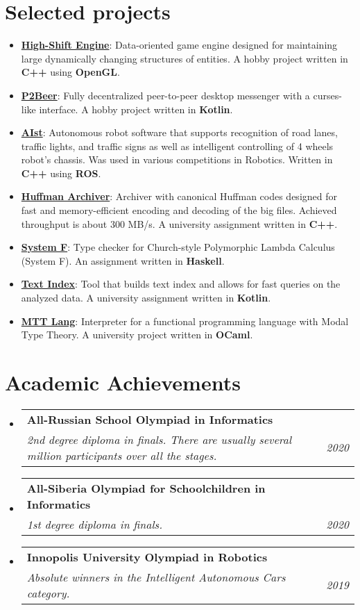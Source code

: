 \documentclass[letterpaper,11pt]{article}
\makeatletter
\newcommand{\resumeItem}[2]{
  \item\small{
    \textbf{#1}{: #2 \vspace{-2pt}}
  }
}
\newcommand{\resumeSubheading}[4]{
  \vspace{-1pt}\item
    \begin{tabular*}{0.97\textwidth}{l@{\extracolsep{\fill}}r}
      \textbf{#1} & #2 \\
      \textit{\small#3} & \textit{\small #4} \\
    \end{tabular*}\vspace{-5pt}
}
\newcommand{\resumeSubItem}[2]{\resumeItem{#1}{#2}\vspace{-4pt}}
\newcommand{\resumeSubHeadingListStart}{\begin{itemize}[leftmargin=*]}
\newcommand{\resumeSubHeadingListEnd}{\end{itemize}}
\makeatother
\begin{document}
\section{Selected projects}
  \resumeSubHeadingListStart
    \resumeSubItem{\href{https://github.com/bot-mne-v-rot/high-shift-engine}{High-Shift Engine}}
      {Data-oriented game engine designed for maintaining large dynamically changing structures of entities. A hobby project written in \textbf{C++} using \textbf{OpenGL}.}
    \resumeSubItem{\href{https://github.com/bot-mne-v-rot/p2beer}{P2Beer}}
      {Fully decentralized peer-to-peer desktop messenger with a curses-like interface. A hobby project written in \textbf{Kotlin}.}
    \resumeSubItem{\href{https://github.com/SmnTin/AIst}{AIst}}
      {Autonomous robot software that supports recognition of road lanes, traffic lights, and traffic signs as well as intelligent controlling of 4 wheels robot's chassis. Was used in various competitions in Robotics. Written in \textbf{C++} using \textbf{ROS}.}
    \resumeSubItem{\href{https://github.com/SmnTin/huffman-archiver}{Huffman Archiver}}
      {Archiver with canonical Huffman codes designed for fast and memory-efficient encoding and decoding of the big files. Achieved throughput is about 300 MB/s. A university assignment written in \textbf{C++}.}
    \resumeSubItem{\href{https://github.com/SmnTin/simple-type-checker/tree/system-f}{System F}}
      {Type checker for Church-style Polymorphic Lambda Calculus (System F). An assignment written in \textbf{Haskell}.}
    \resumeSubItem{\href{https://github.com/SmnTin/prog-2020-text-index-SmnTin}{Text Index}}
      {Tool that builds text index and allows for fast queries on the analyzed data.  A university assignment written in \textbf{Kotlin}.}
    \resumeSubItem{\href{https://github.com/SmnTin/mtt-lang}{MTT Lang}}{Interpreter for a functional programming language with Modal Type Theory. A university project written in \textbf{OCaml}.}
  \resumeSubHeadingListEnd

\section{Academic Achievements}
  \resumeSubHeadingListStart
    \resumeSubheading{All-Russian School Olympiad in Informatics}{}
    {2nd degree diploma in finals. There are usually several million participants over all the stages.}{2020}
    \resumeSubheading{All-Siberia Olympiad for Schoolchildren in Informatics}{}
    {1st degree diploma in finals.}{2020}
    \resumeSubheading{Innopolis University Olympiad in Robotics}{}
    {Absolute winners in the Intelligent Autonomous Cars category.}{2019}
  \resumeSubHeadingListEnd
\end{document}
